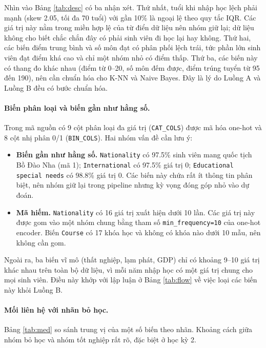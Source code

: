 \documentclass[12pt,a4paper]{article}
\begin{document}
Nhìn vào Bảng \ref{tab:desc} có ba nhận xét. Thứ nhất, tuổi khi nhập học lệch phải mạnh (skew 2.05, tối đa 70 tuổi) với gần 10\% là ngoại lệ theo quy tắc IQR. Các giá trị này nằm trong miền hợp lệ của từ điển dữ liệu nên nhóm giữ lại; dữ liệu không cho biết chắc chắn đây có phải sinh viên đi học lại hay không. Thứ hai, các biến điểm trung bình và số môn đạt có phân phối lệch trái, tức phần lớn sinh viên đạt điểm khá cao và chỉ một nhóm nhỏ có điểm thấp. Thứ ba, các biến này có thang đo khác nhau (điểm từ 0--20, số môn đếm được, điểm trúng tuyển từ 95 đến 190), nên cần chuẩn hóa cho K-NN và Naive Bayes. Đây là lý do Luồng A và Luồng B đều có bước chuẩn hóa.

\paragraph{Biến phân loại và biến gần như hằng số.} Trong mã nguồn có 9 cột phân loại đa giá trị (\texttt{CAT\_COLS}) được mã hóa one-hot và 8 cột nhị phân 0/1 (\texttt{BIN\_COLS}). Hai nhóm vấn đề cần lưu ý:
\begin{itemize}[leftmargin=2em]
\item \textbf{Biến gần như hằng số.} \texttt{Nationality} có 97.5\% sinh viên mang quốc tịch Bồ Đào Nha (mã 1); \texttt{International} có 97.5\% giá trị 0; \texttt{Educational special needs} có 98.8\% giá trị 0. Các biến này chứa rất ít thông tin phân biệt, nên nhóm giữ lại trong pipeline nhưng kỳ vọng đóng góp nhỏ vào dự đoán.
\item \textbf{Mã hiếm.} \texttt{Nationality} có 16 giá trị xuất hiện dưới 10 lần. Các giá trị này được gom vào một nhóm chung bằng tham số \texttt{min\_frequency=10} của one-hot encoder. Biến \texttt{Course} có 17 khóa học và không có khóa nào dưới 10 mẫu, nên không cần gom.
\end{itemize}
Ngoài ra, ba biến vĩ mô (thất nghiệp, lạm phát, GDP) chỉ có khoảng 9--10 giá trị khác nhau trên toàn bộ dữ liệu, vì mỗi năm nhập học có một giá trị chung cho mọi sinh viên. Điều này khớp với lập luận ở Bảng \ref{tab:flow} về việc loại các biến này khỏi Luồng B.

\paragraph{Mối liên hệ với nhãn bỏ học.} Bảng \ref{tab:med} so sánh trung vị của một số biến theo nhãn. Khoảng cách giữa nhóm bỏ học và nhóm tốt nghiệp rất rõ, đặc biệt ở học kỳ 2.
\end{document}
